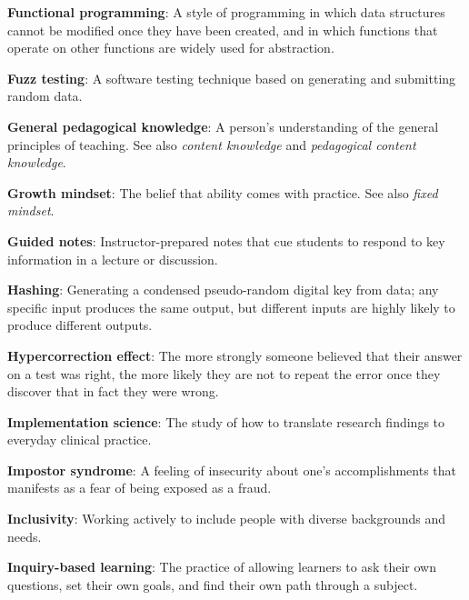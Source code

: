 \textbf{\hypertarget{g:functional-programming}{Functional programming}\label{g:functional-programming}}: A style
of programming in which data structures cannot be modified once they
have been created, and in which functions that operate on other
functions are widely used for abstraction.

\textbf{\hypertarget{g:fuzz-testing}{Fuzz testing}\label{g:fuzz-testing}}: A software testing technique
based on generating and submitting random data.

\textbf{\hypertarget{g:general-pedagogical-knowledge}{General pedagogical knowledge}\label{g:general-pedagogical-knowledge}}:
A person's understanding of the general principles of teaching. See also
\emph{content knowledge} and \emph{pedagogical content knowledge}.

\textbf{\hypertarget{g:growth-mindset}{Growth mindset}\label{g:growth-mindset}}: The belief that ability
comes with practice. See also \emph{fixed mindset}.

\textbf{\hypertarget{g:guided-notes}{Guided notes}\label{g:guided-notes}}: Instructor-prepared notes
that cue students to respond to key information in a lecture or
discussion.

\textbf{\hypertarget{g:hashing}{Hashing}\label{g:hashing}}: Generating a condensed pseudo-random
digital key from data; any specific input produces the same output, but
different inputs are highly likely to produce different outputs.

\textbf{\hypertarget{g:hypercorrection}{Hypercorrection effect}\label{g:hypercorrection}}: The more
strongly someone believed that their answer on a test was right, the
more likely they are not to repeat the error once they discover that in
fact they were wrong.

\textbf{\hypertarget{g:implementation-science}{Implementation science}\label{g:implementation-science}}: The study
of how to translate research findings to everyday clinical practice.

\textbf{\hypertarget{g:impostor-syndrome}{Impostor syndrome}\label{g:impostor-syndrome}}: A feeling of
insecurity about one's accomplishments that manifests as a fear of being
exposed as a fraud.

\textbf{\hypertarget{g:inclusivity}{Inclusivity}\label{g:inclusivity}}: Working actively to include
people with diverse backgrounds and needs.

\textbf{\hypertarget{g:inquiry-based-learning}{Inquiry-based learning}\label{g:inquiry-based-learning}}: The
practice of allowing learners to ask their own questions, set their own
goals, and find their own path through a subject.

